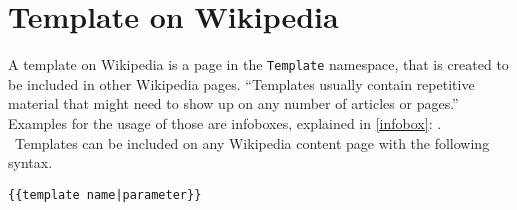 \section{Template on Wikipedia}

A template on Wikipedia is a page in the \texttt{\justify Template} namespace, that is created to be included in other Wikipedia pages. ``Templates usually contain repetitive material that might need to show up on any number of articles or pages.'' \citep{wiki:21} Examples for the usage of those are infoboxes, explained in \ref{infobox}: . \\\
Templates can be included on any Wikipedia content page with the following syntax.
\begin{lstlisting}[frame=single] 
{{template name|parameter}}
\end{lstlisting}